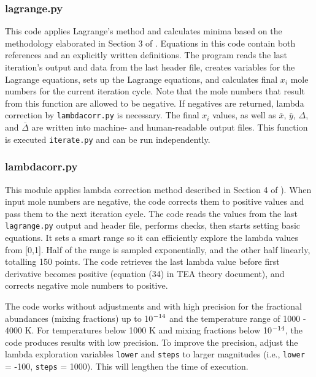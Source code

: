 \subsubsection{lagrange.py}

This code applies Lagrange's method and calculates minima based on the
methodology elaborated in Section 3
of \citet{BlecicEtal2015-TEAtheory}. Equations in this code contain
both references and an explicitly written definitions.  The program
reads the last iteration's output and data from the last header file,
creates variables for the Lagrange equations, sets up the Lagrange
equations, and calculates final $x_i$ mole numbers for the current
iteration cycle. Note that the mole numbers that result from this
function are allowed to be negative. If negatives are returned, lambda
correction by
\texttt{lambdacorr.py} is necessary. The final $x_i$ values, as well as 
$\bar{x}$, $\bar{y}$, $\Delta$, and $\bar\Delta$ are written into
machine- and human-readable output files. This function is
executed \texttt{iterate.py} and can be run independently.


\subsubsection{lambdacorr.py}

This module applies lambda correction method described in Section 4
of \citealp{BlecicEtal2015-TEAtheory}). When input mole numbers are
negative, the code corrects them to positive values and pass them to
the next iteration cycle. The code reads the values from the last
\texttt{lagrange.py} output and header file, performs
checks, then starts setting basic equations. It sets a smart range so
it can efficiently explore the lambda values from [0,1]. Half of the
range is sampled exponentially, and the other half linearly, totalling
150 points. The code retrieves the last lambda value before first
derivative becomes positive (equation (34) in TEA theory document),
and corrects negative mole numbers to positive.

The code works without adjustments and with high precision for the
fractional abundances (mixing fractions) up to 10$\sp{-14}$ and the
temperature range of 1000 - 4000 K. For temperatures below 1000 K and
mixing fractions below 10$\sp{-14}$, the code produces results with
low precision. To improve the precision, adjust the lambda exploration
variables \texttt{lower} and \texttt{steps} to larger magnitudes
(i.e., \texttt{lower} = -100, \texttt{steps} = 1000). This will
lengthen the time of execution.


